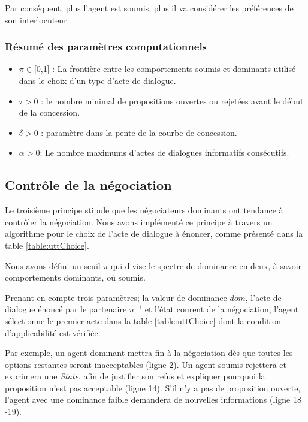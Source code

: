 	Par conséquent, plus l'agent est soumis, plus il va considérer les préférences de son interlocuteur.
	
	\subsubsection*{Résumé des paramètres computationnels}
	\begin{itemize}[noitemsep]
		
		\item $\pi \in $[0,1] : La frontière entre  les comportements soumis et dominants utilisé dans le choix d'un type d'acte de dialogue.
		\item $\tau > 0$ : le nombre minimal de propositions ouvertes ou rejetées avant le début de la concession.
		\item $\delta > 0$ : paramètre dans la pente de la courbe de concession.
		\item $\alpha> 0$: Le nombre maximums d'actes de dialogues informatifs consécutifs.
	\end{itemize}
	
	\subsection{Contrôle de la négociation}
	\label{chp4:controle}
	
	Le troisième principe stipule que les négociateurs dominants ont tendance à contrôler la négociation.
	Nous avons implémenté ce principe à travers un algorithme pour le choix de l'acte de dialogue à énoncer, comme présenté dans la table \ref{table:uttChoice}.
	
	Nous avons défini un seuil $\pi$  qui divise le spectre de dominance en deux, à savoir comportements dominants, où soumis.
	
	Prenant en compte trois paramètres; la valeur de dominance $dom$, l'acte de dialogue énoncé par le partenaire $u^{-1}$ et l'état courent de la négociation, l'agent sélectionne le premier acte dans la table \ref{table:uttChoice} dont la condition d'applicabilité est vérifiée.  
	
	
	Par exemple, un agent dominant mettra fin à la négociation dès que toutes les options restantes seront inacceptables (ligne 2). Un agent soumis rejettera et exprimera une \emph{State}, afin de justifier son refus et expliquer pourquoi la proposition n'est pas acceptable (ligne 14). S'il n'y a pas de proposition ouverte, l'agent avec une dominance faible demandera de nouvelles informations (ligne 18 -19).
	
